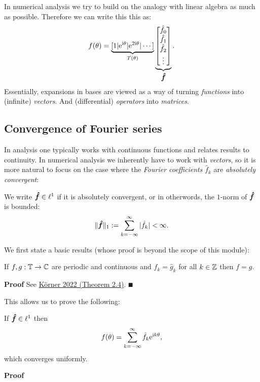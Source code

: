 In numerical analysis we try to build on the analogy with linear algebra as much as possible. Therefore we  can write this this as:
\[
f(\theta) = \underbrace{[1 | {\rm e}^{{\rm i}\theta} | {\rm e}^{2{\rm i}\theta} | \cdots]}_{T(\theta)}
\underbrace{\begin{bmatrix} \hat f_0 \\ \hat f_1 \\ \hat f_2 \\ \vdots \end{bmatrix}}_{{\mbox{\boldmath$\hat f$\unboldmath}}}.
\]
Essentially, expansions in bases are viewed as a way of turning \emph{functions} into (infinite) \emph{vectors}. And (differential) \emph{operators} into \emph{matrices}.

\subsection{Convergence of Fourier series}
In analysis one typically works with continuous functions and relates results to continuity. In numerical analysis we inherently have to work with \emph{vectors}, so it is more natural to  focus on the case where the \emph{Fourier coefficients} $\hat f_k$ are \emph{absolutely convergent}:

\begin{definition} We write ${\mbox{\boldmath$\hat f$\unboldmath}} \in \ell^1$ if it is absolutely convergent, or in otherwords, the $1$-norm of ${\mbox{\boldmath$\hat f$\unboldmath}}$ is bounded:
\[
\|{\mbox{\boldmath$\hat f$\unboldmath}}\|_1 := \sum_{k=-\infty}^\infty |\hat f_k| < \infty.
\]
\end{definition}

We first state a  basic results (whose proof is beyond the scope of this module):

\begin{theorem} If $f, g : {\mathbb T} \rightarrow {\mathbb C}$ are periodic and continuous and $\hat f_k = \hat g_k$ for all $k \in {\mathbb Z}$ then $f = g$.

\end{theorem}
\textbf{Proof} See \href{https://www.cambridge.org/core/books/fourier-analysis/5FD8F0FD69DDB139019655D7F8440D2F}{Körner 2022 (Theorem 2.4)}. \ensuremath{\QED}

This allows us to prove the following:

\begin{theorem} If ${\mbox{\boldmath$\hat f$\unboldmath}} \in \ell^1$ then
\[
f(\theta) = \sum_{k = -\infty}^\infty \hat f_k {\rm e}^{{\rm i} k \theta},
\]
which converges uniformly. \end{theorem}
\textbf{Proof}

